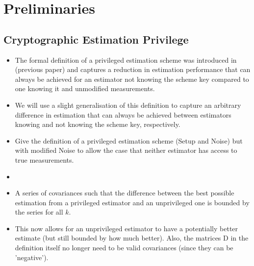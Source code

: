 \documentclass[conference]{IEEEtran}
\begin{document}
% 
%                                                                 
%                                                                 
%                                                                 
% 

\section{Preliminaries}
\subsection{Cryptographic Estimation Privilege}
\begin{itemize}
  \item The formal definition of a privileged estimation scheme was introduced in (previous paper) and captures a reduction in estimation performance that can always be achieved for an estimator not knowing the scheme key compared to one knowing it and unmodified measurements.
  \item We will use a slight generalisation of this definition to capture an arbitrary difference in estimation that can always be achieved between estimators knowing and not knowing the scheme key, respectively.
  \item Give the definition of a privileged estimation scheme (Setup and Noise) but with modified Noise to allow the case that neither estimator has access to true measurements.
  \item 
  \item A series of covariances such that the difference between the best possible estimation from a privileged estimator and an unprivileged one is bounded by the series for all $k$.
  \item This now allows for an unprivileged estimator to have a potentially better estimate (but still bounded by how much better). Also, the matrices D in the definition itself no longer need to be valid covariances (since they can be 'negative').
\end{itemize}
\end{document}
